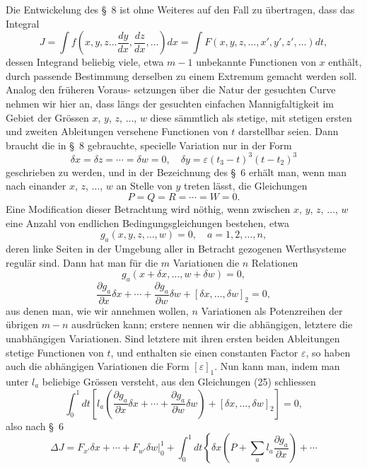 \documentclass[11pt,a4paper,leqno]{article}
\begin{document}
Die Entwickelung des \S~8 ist ohne Weiteres auf den Fall zu übertragen, dass das Integral
\[
J=\int f\left(x,y,z\ldots \frac{dy}{dx},\frac{dz}{dx},\ldots\right)dx=\int F(x,y,z,\ldots,x',y',z',\ldots)dt,
\]
dessen Integrand beliebig viele, etwa $m-1$ unbekannte Functionen von $x$ enthält, durch passende Bestimmung derselben zu einem Extremum gemacht werden soll. Analog den früheren Voraus-
setzungen über die Natur der gesuchten Curve nehmen wir hier an, dass längs der gesuchten einfachen Mannigfaltigkeit im Gebiet der Grössen $x$, $y$, $z$, $\ldots$, $w$ diese sämmtlich als stetige, mit stetigen ersten und zweiten Ableitungen versehene Functionen von $t$ darstellbar seien. Dann braucht die in \S~8 gebrauchte, specielle Variation nur in der Form
\[
\delta x=\delta z=\cdots=\delta w=0,\quad \delta y=\varepsilon(t_3-t)^3(t-t_2)^3
\]
geschrieben zu werden, und in der Bezeichnung des \S~6 erhält man, wenn man nach einander $x$, $z$, $\ldots$, $w$ an Stelle von $y$ treten lässt, die Gleichungen
\[
P=Q=R=\cdots=W=0.
\]
Eine Modification dieser Betrachtung wird nöthig, wenn zwischen $x$, $y$, $z$, $\ldots$, $w$ eine Anzahl von endlichen Bedingungsgleichungen bestehen, etwa
\begin{equation}\tag{24}
g_a(x,y,z,\ldots,w)=0,\quad a=1,2,\ldots,n,
\end{equation}
deren linke Seiten in der Umgebung aller in Betracht gezogenen Werthsysteme regulär sind. Dann hat man für die $m$ Variationen die $n$ Relationen
\[
g_a(x+\delta x,\ldots,w+\delta w)=0,
\]
\begin{equation}\tag{25}
\frac{\partial g_a}{\partial x}\delta x+\cdots+\frac{\partial g_a}{\partial w}\delta w+[\delta x,\ldots,\delta w]_2=0,
\end{equation}
aus denen man, wie wir annehmen wollen, $n$ Variationen als Potenzreihen der übrigen $m-n$ ausdrücken kann; erstere nennen wir die abhängigen, letztere die unabhängigen Variationen. Sind letztere mit ihren ersten beiden Ableitungen stetige Functionen von $t$, und enthalten sie einen constanten Factor $\varepsilon$, so haben auch die abhängigen Variationen die Form $[\varepsilon]_1$. Nun kann man, indem man unter $l_a$ beliebige Grössen versteht, aus den Gleichungen (25) schliessen
\[
\int_0^1 dt\left[l_a\left(\frac{\partial g_a}{\partial x}\delta x+\cdots+\frac{\partial g_a}{\partial w}\delta w\right)+[\delta x,\ldots,\delta w]_2\right]=0,
\]
also nach \S~6
\[
\Delta J=\left. F_{x'}\delta x+\cdots+F_{w'}\delta w\right|_0^1+\int_0^1dt\left\{\delta x\left(P+\sum_a l_a\frac{\partial g_a}{\partial x}\right)+\cdots
\right.
\]
\end{document}
